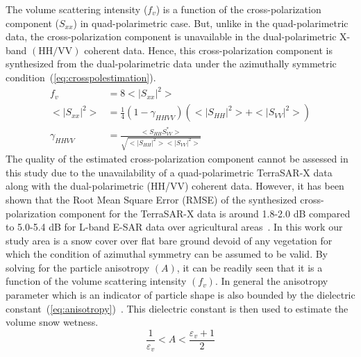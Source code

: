 The volume scattering intensity ($f_v$) is a function of the cross-polarization component ($S_{xx}$) in quad-polarimetric case. But, unlike in the quad-polarimetric data, the cross-polarization component is unavailable in the dual-polarimetric X-band $(\mbox{HH/VV})$ coherent data. Hence, this cross-polarization component is synthesized from the dual-polarimetric data under the azimuthally symmetric condition~(\ref{eq:crosspolestimation}).  
\begin{equation}
\begin{split}
f_v &= 8<|S_{xx}|^2> \\
<|S_{xx}|^2> &= \frac{1}{4} \left(1-\gamma_{HHVV}\right)\left(<|S_{HH}|^2>+<|S_{VV}|^2>\right) \\
\gamma_{HHVV} &= \frac{<S_{HH}S^*_{VV}>}{\sqrt{<|S_{HH}|^2><|S_{VV}|^2>}}
\end{split}
\label{eq:crosspolestimation}
\end{equation}
The quality of the estimated cross-polarization component cannot be assessed in this study due to the unavailability of a quad-polarimetric TerraSAR-X data along with the dual-polarimetric (HH/VV) coherent data. However, it has been shown that the Root Mean Square Error (RMSE) of the synthesized cross-polarization component for the TerraSAR-X data is around 1.8-2.0 dB compared to 5.0-5.4 dB for L-band E-SAR data over agricultural areas~\citep{Jagdhuber2014}. In this work our study area is a snow cover over flat bare ground devoid of any vegetation for which the condition of azimuthal symmetry can be assumed to be valid. By solving for the particle anisotropy $(A)$, it can be readily seen that it is a function of the volume scattering intensity $(f_v)$. In general the anisotropy parameter which is an indicator of particle shape is also bounded by the dielectric constant~(\ref{eq:anisotropy})~\citep{ablitt2000characterisation}. This dielectric constant is then used to estimate the volume snow wetness.
\begin{equation}
\frac{1}{\varepsilon_v} < A < \frac{\varepsilon_v + 1}{2}
\label{eq:anisotropy}
\end{equation}

